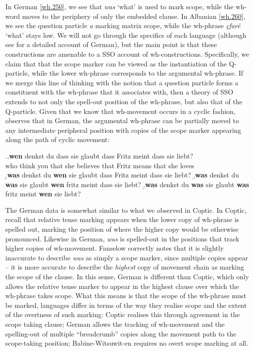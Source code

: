 \documentclass[charis]{glossa}
\begin{document}
In German \ref{wh.250}, we see that \textit{was} `what' is used to mark scope, while the wh-word moves to the periphery of only the embedded clause. In Albanian \ref{wh.260}, we see the question particle \textit{a} marking matrix scope, while the wh-phrase \textit{\c{c}far\"e} `what' stays low. We will not go through the specifics of each language (although see \citealp{fanselow-cavar:2000} for a detailed account of German), but the main point is that these constructions are amenable to a SSO account of wh-constructions. Specifically, we claim that that the scope marker can be viewed as the instantiation of the Q-particle, while the lower wh-phrase corresponds to the argumental wh-phrase. If we merge this line of thinking with the notion that a question particle forms a constituent with the wh-phrase that it associates with, then a theory of SSO extends to not only the spell-out position of the wh-phrase, but also that of the Q-particle. Given that we know that wh-movement occurs in a cyclic fashion, \cite{fanselow:2006} observes that in German, the argumental wh-phrase can be partially moved to any intermediate peripheral position with copies of the scope marker appearing along the path of cyclic movement:

\ex.\label{wh.270}\ag.\label{wh.270a}\textbf{wen} denkst du dass sie glaubt dass Fritz meint dass sie liebt?\\
   who think you that she believes that Fritz means that she loves\\
   \b.\textbf{was} denkst du \textbf{wen} sie glaubt dass Fritz meint dass sie liebt?
   \b.\textbf{was} denkst du \textbf{was} sie glaubt \textbf{wen} fritz meint dass sie liebt?
   \b.\textbf{was} denkst du \textbf{was} sie glaubt \textbf{was} fritz meint \textbf{wen} sie liebt?

The German data is somewhat similar to what we observed in Coptic. In Coptic, recall that relative tense marking appears when the lower copy of wh-phrase is spelled out, marking the position of where the higher copy would be otherwise pronounced. Likewise in German, \textit{was} is spelled-out in the positions that track higher copies of wh-movement. Fanselow correctly notes that it is slightly inaccurate to describe \textit{was} as simply a scope marker, since multiple copies appear -- it is more accurate to describe the \textit{highest} copy of movement chain as marking the scope of the clause. In this sense, German is different than Coptic, which only allows the relative tense marker to appear in the highest clause over which the wh-phrase takes scope. What this means is that the scope of the wh-phrase must be marked, languages differ in terms of the way they realise scope and the extent of the overtness of such marking: Coptic realises this through agreement in the scope taking clause; German allows the tracking of wh-movement and the spelling-out of multiple ``breadcrumb'' copies along the movement path to the scope-taking position; Babine-Witsuwit-en requires no overt scope marking at all.
\end{document}
